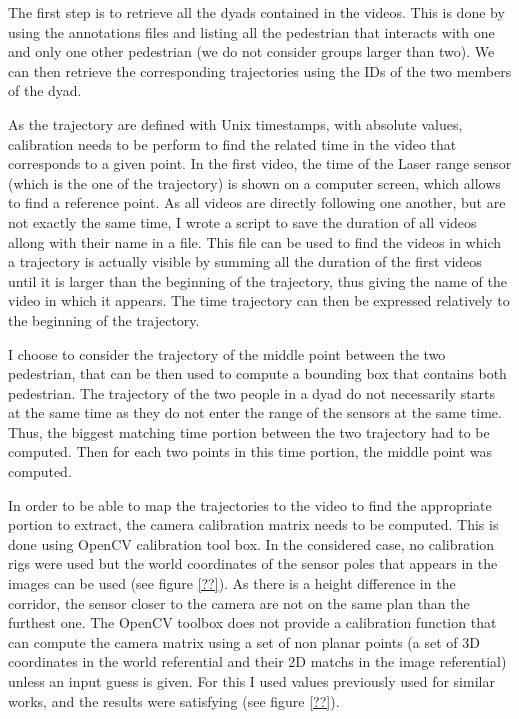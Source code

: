 \documentclass[12pt,a4paper,twoside]{article}
\begin{document}
The first step is to retrieve all the dyads contained in the videos. This is done by using the annotations files and listing all the pedestrian that interacts with one and only one other pedestrian (we do not consider groups larger than two). We can then retrieve the corresponding trajectories using the IDs of the two members of the dyad.

As the trajectory are defined with Unix timestamps, with absolute values, calibration needs to be perform to find the related time in the video that corresponds to a given point. In the first video, the time of the Laser range sensor (which is the one of the trajectory) is shown on a computer screen, which allows to find a reference point. As all videos are directly following one another, but are not exactly the same time, I wrote a script to save the duration of all videos allong with their name in a file. This file can be used to find the videos in which a trajectory is actually visible by summing all the duration of the first videos until it is larger than the beginning of the trajectory, thus giving the name of the video in which it appears. The time trajectory can then be expressed relatively to the beginning of the trajectory. 

I choose to consider the trajectory of the middle point between the two pedestrian, that can be then used to compute a bounding box that contains both pedestrian. The trajectory of the two people in a dyad do not necessarily starts at the same time as they do not enter the range of the sensors at the same time. Thus, the biggest matching time portion between the two trajectory had to be computed. Then for each two points in this time portion, the middle point was computed.

In order to be able to map the trajectories to the video to find the appropriate portion to extract, the camera calibration matrix needs to be computed. This is done using OpenCV calibration tool box. In the considered case, no calibration rigs were used but the world coordinates of the sensor poles that appears in the images can be used (see figure \ref{??}). As there is a height difference in the corridor, the sensor closer to the camera are not on the same plan than the furthest one. The OpenCV toolbox does not provide a calibration function that can compute the camera matrix using a set of non planar points (a set of 3D coordinates in the world referential and their 2D matchs in the image referential) unless an input guess is given. For this I used values previously used for similar works, and the results were satisfying (see figure \ref{??}).
\end{document}
